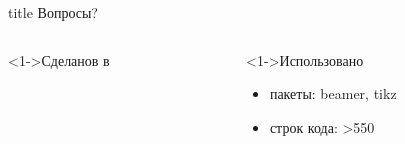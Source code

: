 \documentclass[pdf,9pt,aspectratio=169]{beamer}
\begin{document}
\begin{frame}{}
  \vfill
  \begin{beamercolorbox}[sep=8pt,center,shadow=true,rounded=true]{title}
    Вопросы?
  \end{beamercolorbox}
  \vfill
  \begin{columns}[T]
    \begin{column}[]{0.45\textwidth}  
      \begin{exampleblock}<1->{Сделанов в}
        \begin{center}
           \Huge\LaTeXe
        \end{center}
      \end{exampleblock}
    \end{column}
    \begin{column}[]{0.45\textwidth}  
      \begin{block}<1->{Использовано}
        \begin{itemize}
          \item пакеты: beamer, tikz
          \item строк кода: >550 
        \end{itemize}
      \end{block}
    \end{column}
  \end{columns}
  \vfill
\end{frame}
\end{document}
